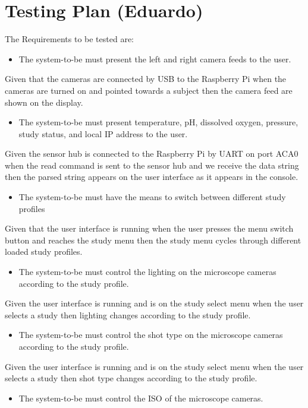 \section{Testing Plan (Eduardo)}
The Requirements to be tested are:
\begin{itemize}
	\item The system-to-be must present the left and right camera feeds to the user.
\end{itemize}
Given that the cameras are connected by USB to the Raspberry Pi when the cameras are turned on and pointed towards a subject then the camera feed are shown on the display.
\begin{itemize}
	\item The system-to-be must present temperature, pH, dissolved oxygen, pressure, study status, and local IP address to the user.
\end{itemize}
Given the sensor hub is connected to the Raspberry Pi by UART on port ACA0 when the read command is sent to the sensor hub and we receive the data string then the parsed string appears on the user interface as it appears in the console.
\begin{itemize}
	\item The system-to-be must have the means to switch between different study profiles
\end{itemize}
Given that the user interface is running when the user presses the menu switch button and reaches the study menu then the study menu cycles through different loaded study profiles.
\begin{itemize}
	\item The system-to-be must control the lighting on the microscope cameras according to the study profile.
\end{itemize}
Given the user interface is running and is on the study select menu when the user selects a study then lighting changes according to the study profile.
\begin{itemize}
	\item The system-to-be must control the shot type on the microscope cameras according to the study profile.
\end{itemize}
Given the user interface is running and is on the study select menu when the user selects a study then  shot type changes according to the study profile.
\begin{itemize}
	\item The system-to-be must control the ISO of the microscope cameras.
\end{itemize}
